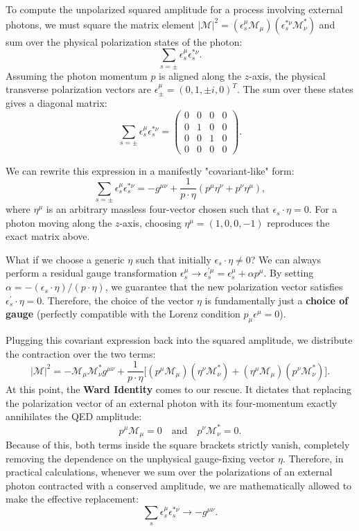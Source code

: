 To compute the unpolarized squared amplitude for a process involving external photons, we must square the matrix element $\vert \mathcal{M} \vert^2 = (\epsilon_s^{\mu} \mathcal{M}_\mu) (\epsilon_{s}^{*\nu} \mathcal{M}^*_\nu)$ and sum over the physical polarization states of the photon:
\[
    \sum_{s = \pm} \epsilon_s^{\mu} \epsilon_{s}^{*\nu}.
\]
Assuming the photon momentum $p$ is aligned along the \(z\)-axis, the physical transverse polarization vectors are $\epsilon_{\pm}^{\mu} = (0, 1, \pm i, 0)^T$. The sum over these states gives a diagonal matrix:
\[
    \sum_{s = \pm} \epsilon_s^{\mu} \epsilon_{s}^{*\nu} = \begin{pmatrix}
        0 & 0 & 0 & 0 \\
        0 & 1 & 0 & 0 \\
        0 & 0 & 1 & 0 \\
        0 & 0 & 0 & 0
    \end{pmatrix}.
\]

We can rewrite this expression in a manifestly "covariant-like" form:
\[
    \sum_{s=\pm} \epsilon_s^{\mu} \epsilon_{s}^{*\nu} = - g^{\mu \nu} + \frac{1}{p \cdot \eta} (p^\mu \eta^\nu + p^\nu \eta^\mu),
\]
where \(\eta^\mu\) is an arbitrary massless four-vector chosen such that \(\epsilon_s \cdot \eta = 0\). For a photon moving along the $z$-axis, choosing $\eta^\mu = (1, 0, 0, -1)$ reproduces the exact matrix above.

What if we choose a generic $\eta$ such that initially $\epsilon_s \cdot \eta \neq 0$? We can always perform a residual gauge transformation $\epsilon_s^\mu \to \epsilon_s^{\prime\mu} = \epsilon_s^\mu + \alpha p^\mu$. By setting $\alpha = -(\epsilon_s \cdot \eta)/(p \cdot \eta)$, we guarantee that the new polarization vector satisfies $\epsilon_s^\prime \cdot \eta = 0$. Therefore, the choice of the vector \(\eta\) is fundamentally just a \textbf{choice of gauge} (perfectly compatible with the Lorenz condition $p_\mu \epsilon^\mu = 0$).

Plugging this covariant expression back into the squared amplitude, we distribute the contraction over the two terms:
\[
    \vert \mathcal{M} \vert^2 = - \mathcal{M}_\mu \mathcal{M}^*_\nu g^{\mu \nu} + \frac{1}{p \cdot \eta} \Big[ (p^\mu \mathcal{M}_\mu) (\eta^\nu \mathcal{M}^*_\nu) + (\eta^\mu \mathcal{M}_\mu) (p^\nu \mathcal{M}^*_\nu) \Big].
\]
At this point, the \textbf{Ward Identity} comes to our rescue. It dictates that replacing the polarization vector of an external photon with its four-momentum exactly annihilates the QED amplitude:
\[
    p^\mu \mathcal{M}_\mu = 0 \quad \text{and} \quad p^\nu \mathcal{M}^*_\nu = 0.
\]
Because of this, both terms inside the square brackets strictly vanish, completely removing the dependence on the unphysical gauge-fixing vector \(\eta\). Therefore, in practical calculations, whenever we sum over the polarizations of an external photon contracted with a conserved amplitude, we are mathematically allowed to make the effective replacement:
\[
    \sum_{s} \epsilon_s^{\mu} \epsilon_{s}^{*\nu} \longrightarrow - g^{\mu \nu}.
\]

